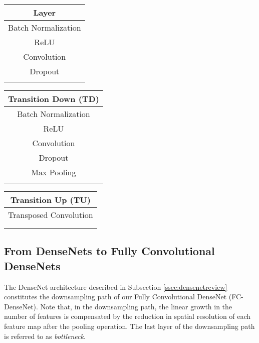 \documentclass[10pt,twocolumn,letterpaper]{article}
\begin{document}
\begin{table*}[!htb]
    \begin{minipage}{.3\linewidth}
\centering
        \begin{tabular}{| c |}
\hline 
\textbf{Layer} \\ \hline \hline
Batch Normalization \\ \hline 
ReLU \\ \hline 
 Convolution \\ \hline Dropout  \\ \hline   
\multicolumn{1}{c}{} \\
\end{tabular}
    \end{minipage}\begin{minipage}{.3\linewidth}
      \centering
\begin{tabular}{| c |}
\hline  
\textbf{Transition Down (TD)} \\ \hline \hline 
Batch Normalization \\ \hline 
ReLU \\ \hline 
 Convolution  \\ \hline 
Dropout   \\ \hline  
 Max Pooling \\ \hline  
\multicolumn{1}{c}{} \\
\end{tabular}
    \end{minipage} 
     \begin{minipage}{.3\linewidth}
\centering
        \begin{tabular}{| c |}
\hline  
\textbf{Transition Up (TU)} \\ \hline \hline 
 Transposed Convolution \\    \\ \hline
\multicolumn{1}{c}{} \\
\end{tabular}
    \end{minipage}\caption{Building blocks of fully convolutional DenseNets. From left to right: layer used in the model, Transition Down (TD) and Transition Up (TU). See text for details.}
\label{tab:blocks}
\end{table*}


\subsection{From DenseNets to Fully Convolutional DenseNets}
\label{ssec:fcdensenets}

The DenseNet architecture described in Subsection \ref{ssec:densenetreview} constitutes the downsampling path of our Fully Convolutional DenseNet (FC-DenseNet). Note that, in the downsampling path, the linear growth in the number of features is compensated by the reduction in spatial resolution of each feature map after the pooling operation. The last layer of the downsampling path is referred to as \emph{bottleneck}.
\end{document}
